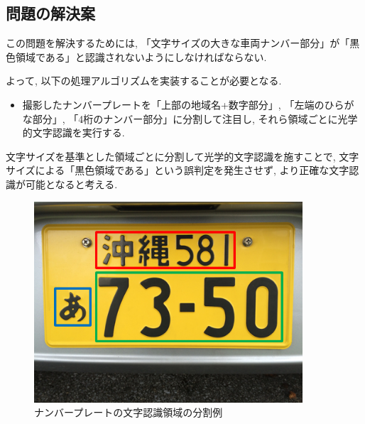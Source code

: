 \subsection{問題の解決案}
この問題を解決するためには, 「文字サイズの大きな車両ナンバー部分」が「黒色領域である」と認識されないようにしなければならない.

よって, 以下の処理アルゴリズムを実装することが必要となる.
\begin{itemize}
\item 撮影したナンバープレートを「上部の地域名+数字部分」, 「左端のひらがな部分」, 「4桁のナンバー部分」に分割して注目し, それら領域ごとに光学的文字認識を実行する.
\end{itemize}

文字サイズを基準とした領域ごとに分割して光学的文字認識を施すことで, 文字サイズによる「黒色領域である」という誤判定を発生させず, より正確な文字認識が可能となると考える.

\begin{figure}
\begin{center}
\includegraphics[width=10cm]{fig/hoge.PNG}
\end{center}
\caption{ナンバープレートの文字認識領域の分割例}
\end{figure}
